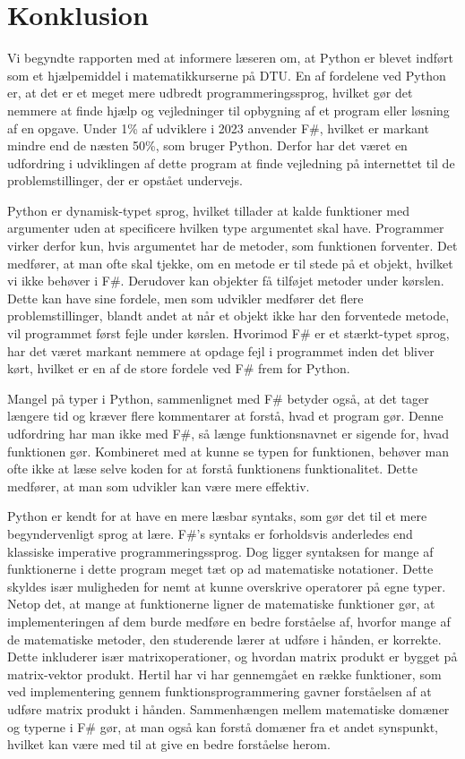 \section{Konklusion}

Vi begyndte rapporten med at informere læseren om, at Python er blevet indført som et hjælpemiddel i matematikkurserne på DTU. En af fordelene ved Python er, at det er et meget mere udbredt programmeringssprog, hvilket gør det nemmere at finde hjælp og vejledninger til opbygning af et program eller løsning af en opgave. Under 1\% af udviklere i 2023 anvender F\#, hvilket er markant mindre end de næsten 50\%, som bruger Python. Derfor har det været en udfordring i udviklingen af dette program at finde vejledning på internettet til de problemstillinger, der er opstået undervejs.

Python er dynamisk-typet sprog, hvilket tillader at kalde funktioner med argumenter uden at specificere hvilken type argumentet skal have.
Programmer virker derfor kun, hvis argumentet har de metoder, som funktionen forventer. Det medfører, at man ofte skal tjekke, om en metode er til stede på et objekt, hvilket vi ikke behøver i F\#.  Derudover kan objekter få tilføjet metoder under kørslen. Dette kan have sine fordele, men som udvikler medfører det flere problemstillinger, blandt andet at når et objekt ikke har den forventede metode, vil programmet først fejle under kørslen.
Hvorimod F\# er et stærkt-typet sprog, har det været markant nemmere at opdage fejl i programmet inden det bliver kørt, hvilket er en af de store fordele ved F\# frem for Python. 

Mangel på typer i Python, sammenlignet med F\# betyder også, at det tager længere tid og kræver flere kommentarer at forstå, hvad et program gør. Denne udfordring har man ikke med F\#, så længe funktionsnavnet er sigende for, hvad funktionen gør. Kombineret med at kunne se typen for funktionen, behøver man ofte ikke at læse selve koden for at forstå funktionens funktionalitet. Dette medfører, at man som udvikler kan være mere effektiv.

Python er kendt for at have en mere læsbar syntaks, som gør det til et mere begyndervenligt sprog at lære. F\#'s syntaks er forholdsvis anderledes end klassiske imperative programmeringssprog. Dog ligger syntaksen for mange af funktionerne i dette program meget tæt op ad matematiske notationer. Dette skyldes især muligheden for nemt at kunne overskrive operatorer på egne typer. Netop det, at mange at funktionerne ligner de matematiske funktioner gør, at implementeringen af dem burde medføre en bedre forståelse af, hvorfor mange af de matematiske metoder, den studerende lærer at udføre i hånden, er korrekte. Dette inkluderer især matrixoperationer, og hvordan matrix produkt er bygget på matrix-vektor produkt. Hertil har vi har gennemgået en række funktioner, som ved implementering gennem funktionsprogrammering gavner forståelsen af at udføre matrix produkt i hånden. Sammenhængen mellem matematiske domæner og typerne i F\# gør, at man også kan forstå domæner fra et andet synspunkt, hvilket kan være med til at give en bedre forståelse herom.

